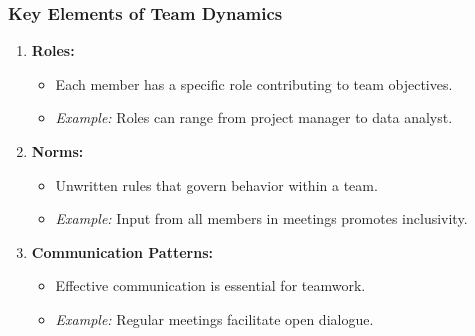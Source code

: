 \documentclass[aspectratio=169]{beamer}
\begin{document}
\begin{frame}[fragile]
    \frametitle{Key Elements of Team Dynamics}
    \begin{enumerate}
        \item \textbf{Roles:} 
          \begin{itemize}
              \item Each member has a specific role contributing to team objectives.
              \item \textit{Example:} Roles can range from project manager to data analyst.
          \end{itemize}
        
        \item \textbf{Norms:} 
          \begin{itemize}
              \item Unwritten rules that govern behavior within a team.
              \item \textit{Example:} Input from all members in meetings promotes inclusivity.
          \end{itemize}
        
        \item \textbf{Communication Patterns:} 
          \begin{itemize}
              \item Effective communication is essential for teamwork.
              \item \textit{Example:} Regular meetings facilitate open dialogue.
          \end{itemize}
    \end{enumerate}
\end{frame}
\end{document}
